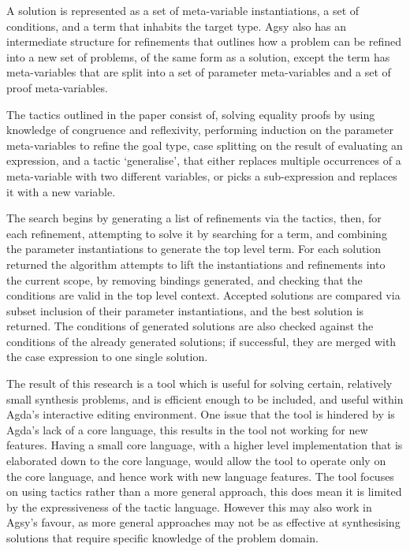\documentclass[a4paper]{article}
\begin{document}
A solution is represented as a set of meta-variable instantiations, a set of conditions, and a term that inhabits the
target type. Agsy also has an intermediate structure for refinements that outlines how a problem can be refined into a new set
of problems, of the same form as a solution, except the term has meta-variables that are split into a set of
parameter meta-variables and a set of proof meta-variables.

The tactics outlined in the paper consist of, solving equality proofs by using knowledge of congruence and reflexivity, 
performing induction on the parameter meta-variables to refine the goal type, case splitting on the result of evaluating 
an expression, and a tactic `generalise', that either replaces multiple occurrences of a meta-variable with two different 
variables, or picks a sub-expression and replaces it with a new variable. 

The search begins by generating a list of refinements via the tactics, then, for each refinement, attempting to solve it by
searching for a term, and combining the parameter instantiations to generate the top level term. For each solution returned the algorithm attempts to lift the instantiations and refinements into 
the current scope, by removing bindings generated, and checking that the conditions are valid in the top level context. Accepted solutions are compared via subset inclusion of their parameter instantiations, and the best solution is returned. The conditions
of generated solutions are also checked against the conditions of the already generated solutions; if successful,
they are merged with the case expression to one single solution. 

The result of this research is a tool which is useful for solving certain, relatively small synthesis problems, and is efficient 
enough to be included, and useful within Agda's interactive editing environment. One issue that the tool is hindered by is Agda's lack of a core language,
this results in the tool not working for new features. Having a small core 
language, with a higher level implementation that is elaborated down to the core language, would allow the tool to operate only
on the core language, and hence work with new language features. The tool focuses 
on using tactics rather than a more general approach, this does mean it is limited by the expressiveness of the tactic language.
However this may also work in Agsy's favour, as more general approaches may not be as effective at synthesising solutions that 
require specific knowledge of the problem domain.
\end{document}
